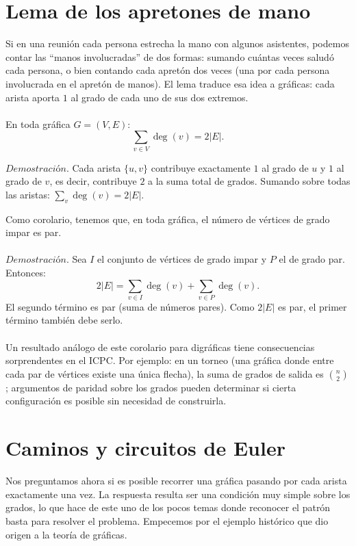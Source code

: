 \section{Lema de los apretones de mano}
Si en una reunión cada persona estrecha la mano con algunos asistentes, podemos contar las ``manos involucradas'' de dos formas: sumando cuántas veces saludó cada persona, o bien contando cada apretón dos veces (una por cada persona involucrada en el apretón de manos). El lema traduce esa idea a gráficas: cada arista aporta $1$ al grado de cada uno de sus dos extremos.
\\\\
En toda gráfica $G = (V, E)$:
\[
\sum_{v \in V} \deg(v) = 2|E|.
\]

$Demostración$. Cada arista $\{u, v\}$ contribuye exactamente $1$ al grado de $u$ y $1$ al grado de $v$, es decir, contribuye $2$ a la suma total de grados. Sumando sobre todas las aristas: $\sum_v \deg(v) = 2|E|$. 

Como corolario, tenemos que, en toda gráfica, el número de vértices de grado impar es par.
\\\\
$Demostración$.
Sea $I$ el conjunto de vértices de grado impar y $P$ el de grado par. Entonces:
\[
2|E| = \sum_{v \in I} \deg(v) + \sum_{v \in P} \deg(v).
\]
El segundo término es par (suma de números pares). Como $2|E|$ es par, el primer término también debe serlo.
\\\\
Un resultado análogo de este corolario para digráficas tiene consecuencias sorprendentes en el ICPC. Por ejemplo: en un torneo (una gráfica donde entre cada par de vértices existe una única flecha), la suma de grados de salida es $\binom{n}{2}$; argumentos de paridad sobre los grados pueden determinar si cierta configuración es posible sin necesidad de construirla.

\section{Caminos y circuitos de Euler}

Nos preguntamos ahora si es posible recorrer una gráfica pasando por cada arista exactamente una vez. La respuesta resulta ser una condición muy simple sobre los grados, lo que hace de este uno de los pocos temas donde reconocer el patrón basta para resolver el problema. Empecemos por el ejemplo histórico que dio origen a la teoría de gráficas.

